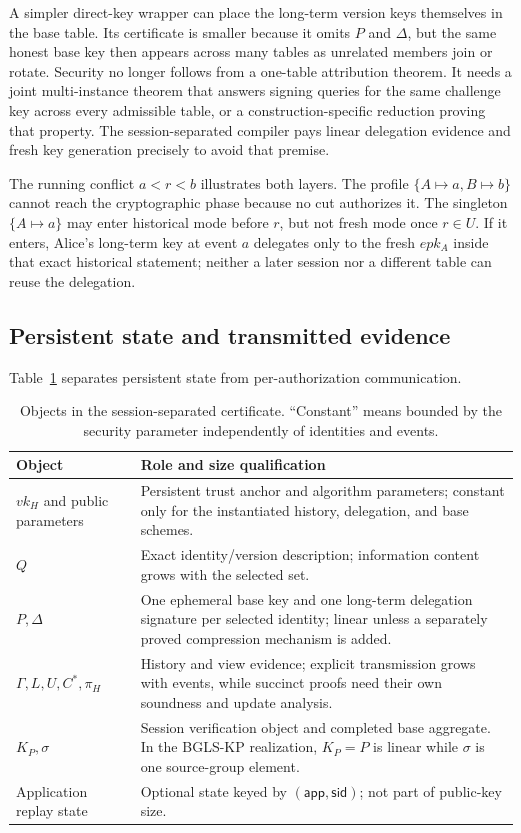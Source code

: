 \documentclass[11pt]{article}
\theoremstyle{definition}
\begin{document}
A simpler direct-key wrapper can place the long-term version keys themselves in the base table.  Its certificate is smaller because it omits $P$ and $\Delta$, but the same honest base key then appears across many tables as unrelated members join or rotate.  Security no longer follows from a one-table attribution theorem.  It needs a joint multi-instance theorem that answers signing queries for the same challenge key across every admissible table, or a construction-specific reduction proving that property.  The session-separated compiler pays linear delegation evidence and fresh key generation precisely to avoid that premise.

The running conflict $a<r<b$ illustrates both layers.  The profile $\{A\mapsto a,B\mapsto b\}$ cannot reach the cryptographic phase because no cut authorizes it.  The singleton $\{A\mapsto a\}$ may enter historical mode before $r$, but not fresh mode once $r\in U$.  If it enters, Alice's long-term key at event $a$ delegates only to the fresh $epk_A$ inside that exact historical statement; neither a later session nor a different table can reuse the delegation.

\subsection{Persistent state and transmitted evidence}
Table~\ref{tab:sizes} separates persistent state from per-authorization communication.
\begin{table}[t]
\centering
\caption{Objects in the session-separated certificate.  ``Constant'' means bounded by the security parameter independently of identities and events.}
\label{tab:sizes}
\begin{tabularx}{\linewidth}{@{}p{.25\linewidth}X@{}}
\toprule
Object & Role and size qualification\\
\midrule
$vk_H$ and public parameters & Persistent trust anchor and algorithm parameters; constant only for the instantiated history, delegation, and base schemes.\\
$Q$ & Exact identity/version description; information content grows with the selected set.\\
$P,\Delta$ & One ephemeral base key and one long-term delegation signature per selected identity; linear unless a separately proved compression mechanism is added.\\
$\Gamma,L,U,C^*,\pi_H$ & History and view evidence; explicit transmission grows with events, while succinct proofs need their own soundness and update analysis.\\
$K_P,\sigma$ & Session verification object and completed base aggregate.  In the BGLS-KP realization, $K_P=P$ is linear while $\sigma$ is one source-group element.\\
Application replay state & Optional state keyed by $(\mathsf{app},\mathsf{sid})$; not part of public-key size.\\
\bottomrule
\end{tabularx}
\end{table}
\end{document}
